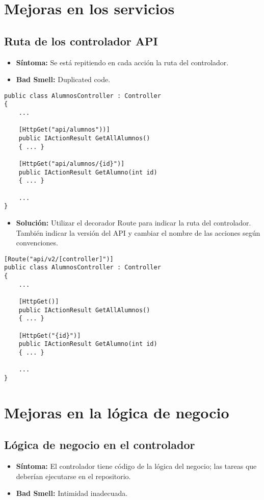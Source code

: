 \section{Mejoras en los servicios}

\subsection{Ruta de los controlador API}
\begin{itemize}
	\item \textbf{Síntoma:} Se está repitiendo en cada acción la ruta del controlador.
	\item \textbf{Bad Smell:} Duplicated code.
\end{itemize}

\begin{lstlisting}[language={[Sharp]C}]
public class AlumnosController : Controller
{
	...	
	
	[HttpGet("api/alumnos"))]
	public IActionResult GetAllAlumnos()
	{ ... }
	
	[HttpGet("api/alumnos/{id}")]
	public IActionResult GetAlumno(int id)
	{ ... }
	
	...
}
\end{lstlisting}

\begin{itemize}	
	\item \textbf{Solución:} Utilizar el decorador Route para indicar la ruta del controlador. También indicar la versión del API y cambiar el nombre de las acciones según convenciones.
\end{itemize}

\begin{lstlisting}[language={[Sharp]C}]
[Route("api/v2/[controller]")]
public class AlumnosController : Controller
{
	...	
	
	[HttpGet()]
	public IActionResult GetAllAlumnos()
	{ ... }
	
	[HttpGet("{id}")]
	public IActionResult GetAlumno(int id)
	{ ... }
	
	...
}
\end{lstlisting}

\section{Mejoras en la lógica de negocio}


\subsection{Lógica de negocio en el controlador}
\begin{itemize}
	\item \textbf{Síntoma:} El controlador tiene código de la lógica del negocio; las tareas que deberían ejecutarse en el repositorio.
	\item \textbf{Bad Smell:} Intimidad inadecuada.
\end{itemize}

